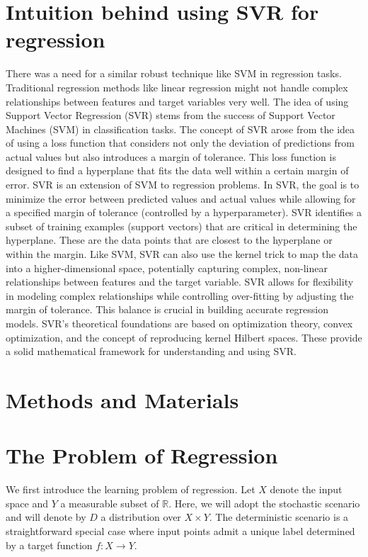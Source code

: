\documentclass[fleqn,10pt]{olplainarticle}
\begin{document}
\section*{Intuition behind using SVR for regression}
There was a need for a similar robust technique like SVM in regression tasks. Traditional regression methods like linear regression might not handle complex relationships between features and target variables very well. The idea of using Support Vector Regression (SVR) stems from the success of Support Vector Machines (SVM) in classification tasks. The concept of SVR arose from the idea of using a loss function that considers not only the deviation of predictions from actual values but also introduces a margin of tolerance. This loss function is designed to find a hyperplane that fits the data well within a certain margin of error. SVR is an extension of SVM to regression problems. In SVR, the goal is to minimize the error between predicted values and actual values while allowing for a specified margin of tolerance (controlled by a hyperparameter). SVR identifies a subset of training examples (support vectors) that are critical in determining the hyperplane. These are the data points that are closest to the hyperplane or within the margin. Like SVM, SVR can also use the kernel trick to map the data into a higher-dimensional space, potentially capturing complex, non-linear relationships between features and the target variable. SVR allows for flexibility in modeling complex relationships while controlling over-fitting by adjusting the margin of tolerance. This balance is crucial in building accurate regression models. SVR's theoretical foundations are based on optimization theory, convex optimization, and the concept of reproducing kernel Hilbert spaces. These provide a solid mathematical framework for understanding and using SVR.

\section*{Methods and Materials}


\section{The Problem of Regression}
We first introduce the learning problem of regression. Let \(X\) denote the input space
and \(Y\) a measurable subset of \(\mathbb{R}\). Here, we will adopt the stochastic scenario and
will denote by \(D\) a distribution over \(X \times Y\). The deterministic scenario is a straightforward special case where input points admit a unique label determined by a target function \(f : X \to Y\).
\end{document}
